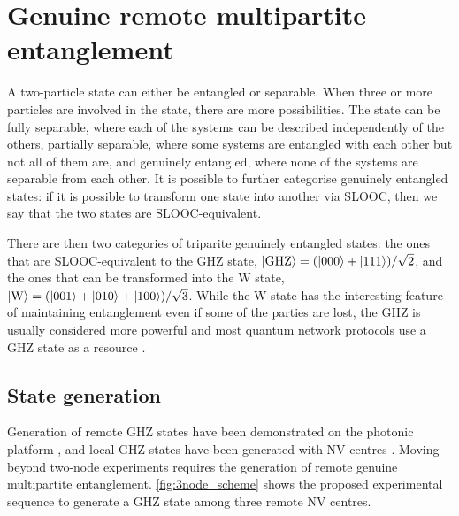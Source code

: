 \documentclass[a4paper]{article}
\begin{document}
\section{Genuine remote multipartite entanglement}
\label{sec:multipartite}
A two-particle state can either be entangled or separable. When three or more particles are involved in the state, there are more possibilities. The state can be fully separable, where each of the systems can be described independently of the others, partially separable, where some systems are entangled with each other but not all of them are, and genuinely entangled, where none of the systems are separable from each other.
It is possible to further categorise genuinely entangled states: if it is possible to transform one state into another via \ac{SLOOC}, then we say that the two states are \ac{SLOOC}-equivalent.

There are then two categories of triparite genuinely entangled states: the ones that are \ac{SLOOC}-equivalent to the \ac{GHZ} state, $\ket{\text{GHZ}} = (\ket{000} + \ket{111})/\sqrt 2 $, and the ones that can be transformed into the W state, $\ket{\text{W}} = (\ket{001} + \ket{010} + \ket{100})/\sqrt 3 $. While the W state has the interesting feature of maintaining entanglement even if some of the parties are lost, the \ac{GHZ} is usually considered more powerful and most quantum network protocols use a GHZ state as a resource . 

\subsection{State generation}

Generation of remote GHZ states have been demonstrated on the photonic platform \cite{Bouwmeester1999}, and local GHZ states have been generated with \ac{NV} centres . Moving beyond two-node experiments requires the generation of remote genuine multipartite entanglement. \autoref{fig:3node_scheme} shows the proposed experimental sequence to generate a GHZ state among three remote \ac{NV} centres.
\end{document}
